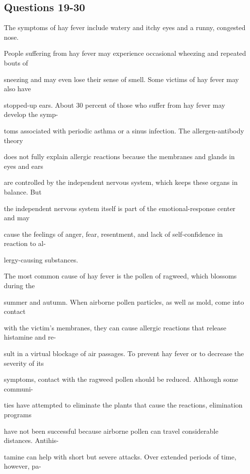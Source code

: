 \documentclass[12pt]{article}
\begin{document}
\subsection*{Questions 19-30}
\begingroup
\small
\sloppy
\setlength{\parskip}{0pt}
\setlength{\parindent}{0pt}
The symptoms of hay fever include watery and itchy eyes and a runny, congested nose.\par
People suffering from hay fever may experience occasional wheezing and repeated bouts of\par
sneezing and may even lose their sense of smell. Some victims of hay fever may also have\par
stopped-up ears. About 30 percent of those who suffer from hay fever may develop the symp-\par
toms associated with periodic asthma or a sinus infection. The allergen-antibody theory\par
does not fully explain allergic reactions because the membranes and glands in eyes and ears\par
are controlled by the independent nervous system, which keeps these organs in balance. But\par
the independent nervous system itself is part of the emotional-response center and may\par
cause the feelings of anger, fear, resentment, and lack of self-confidence in reaction to al-\par
lergy-causing substances.\par
The most common cause of hay fever is the pollen of ragweed, which blossoms during the\par
summer and autumn. When airborne pollen particles, as well as mold, come into contact\par
with the victim's membranes, they can cause allergic reactions that release histamine and re-\par
sult in a virtual blockage of air passages. To prevent hay fever or to decrease the severity of its\par
symptoms, contact with the ragweed pollen should be reduced. Although some communi-\par
ties have attempted to eliminate the plants that cause the reactions, elimination programs\par
have not been successful because airborne pollen can travel considerable distances. Antihis-\par
tamine can help with short but severe attacks. Over extended periods of time, however, pa-\par
\end{document}
